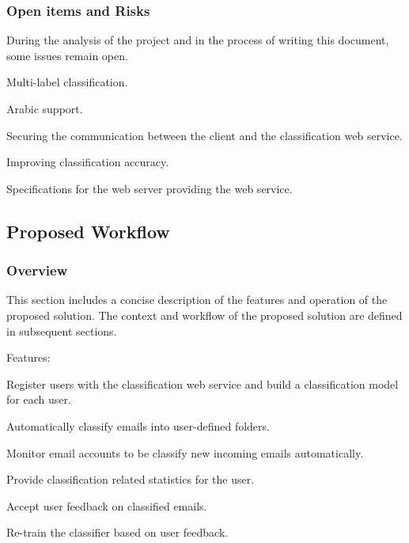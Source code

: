 \subsubsection{Open items and Risks}
During the analysis of the project and in the process of writing this document, 
some issues remain open.
\begin{my_itemize}
  \item Multi-label classification.
  \item Arabic support.
  \item Securing the communication between the client and the classification web service.
  \item Improving classification accuracy.
  \item Specifications for the web server providing the web service.
\end{my_itemize}


\subsection{Proposed Workflow}
\subsubsection{Overview}
This section includes a concise description of the features and operation of the 
proposed solution. The context and workflow of the proposed solution are defined in subsequent sections.

Features:
\begin{my_itemize}
  \item Register users with the classification web service and build a classification model for each user.
  \item Automatically classify emails into user-defined folders.
  \item Monitor email accounts to be classify new incoming emails automatically.
  \item Provide classification related statistics for the user.
  \item Accept user feedback on classified emails.
  \item Re-train the classifier based on user feedback.
\end{my_itemize}

